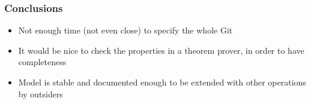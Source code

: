 \documentclass{beamer}
\begin{document}
\begin{frame}
	\frametitle{Conclusions}
	\begin{itemize}
	\item Not enough time (not even close) to specify the whole Git
	\item It would be nice to check the properties in a theorem prover, in
	order to have completeness
	\item Model is stable and documented enough to be extended with other operations by outsiders
	\end{itemize}
\end{frame}
\end{document}
